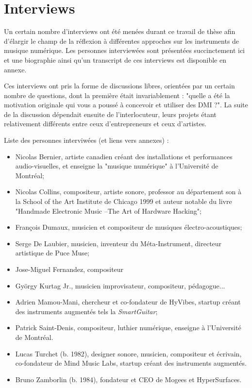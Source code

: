 \section{Interviews}
Un certain nombre d'interviews ont été menées durant ce travail de thèse afin d'élargir le champ de la réflexion à différentes approches sur les instruments de musique numérique. Les personnes interviewées sont présentées succinctement ici et une biographie ainsi qu'un transcript de ces interviews est disponible en annexe.

Ces interviews ont pris la forme de discussions libres, orientées par un certain nombre de questions, dont la première était invariablement : "quelle a été la motivation originale qui vous a poussé à concevoir et utiliser des DMI ?". La suite de la discussion dépendait ensuite de l'interlocuteur, leurs projets étant relativement différents entre ceux d'entrepreneurs et ceux d'artistes.


Liste des personnes interviwées (et liens vers annexes) :

\vspace{-1em}
\begin{itemize}[noitemsep]
\item Nicolas Bernier, artiste canadien créant des installations et performances audio-visuelles, et enseigne la "musique numérique" à l'Université de Montréal;
\item Nicolas Collins, compositeur, artiste sonore, professor au département son  à la School of the Art Institute de Chicago 1999 et auteur notable du livre "Handmade Electronic Music –The Art of Hardware Hacking";
\item François Dumaux, musicien et compositeur de musiques électro-acoustiques;
\item Serge De Laubier, musicien, inventeur du Méta-Instrument, directeur artistique de Puce Muse;
\item Jose-Miguel Fernandez, compositeur 
\item György Kurtag Jr., musicien improvisateur, compositeur, pédagogue...
\item Adrien Mamou-Mani, chercheur et co-fondateur de HyVibes, startup créant des instruments augmentés tels la \textit{SmartGuitar};
\item Patrick Saint-Denis, compositeur, luthier numérique, enseigne à l'Université de Montréal.
\item Lucas Turchet (b. 1982), designer sonore, musicien, compositeur et écrivain, co-fondateur de Mind Music Labs, startup créant des instruments augmentés.
\item Bruno Zamborlin (b. 1984), fondateur et CEO de Mogees et HyperSurfaces. 
\end{itemize}




